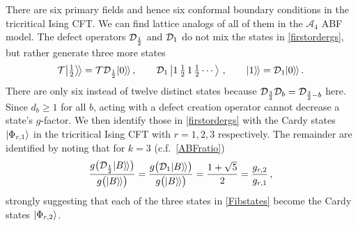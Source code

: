 There are six primary fields and hence six conformal boundary conditions in the tricritical Ising CFT. We can find lattice analogs of all of them in the $\mathcal{A}_4$ ABF model. The defect operators $\mathcal{D}_{\frac12}$ and $\mathcal{D}_1$ do not mix the states in \eqref{firstordergs}, but rather generate three more states
\begin{align}
	\mathcal{T}{\big|{\tfrac12}\big\rangle\!\big\rangle} = \mathcal{T}\mathcal{D}_{\frac12}{|{0}\rangle\mkern-2mu\rangle} \,,
	\qquad\mathcal{D}_1\Ket{1\,\tfrac{1}{2}\,1\,\tfrac{1}{2}\cdots} \,,\qquad {|{1}\rangle\mkern-2mu\rangle}=\mathcal{D}_1{|{0}\rangle\mkern-2mu\rangle} \,.
\label{Fibstates}
\end{align}
There are only six instead of twelve distinct states because $\mathcal{D}_{\frac32}\mathcal{D}_b=\mathcal{D}_{\frac32-b}$ here. Since $d_b\ge 1$ for all $b$, acting with a defect creation operator cannot decrease a state's $g$-factor.
We then identify those in \eqref{firstordergs} with the Cardy states $\Ket{\Phi_{r,1}}$ in the tricritical Ising CFT with $r=1,2,3$ respectively.
The remainder are identified by noting that 
for $k=3$ (c.f.\  \eqref{ABFratio})
\begin{align}
\frac{g\big(\mathcal{D}_{\frac12}{|{B}\rangle\mkern-2mu\rangle}\big)}{g\big({|{B}\rangle\mkern-2mu\rangle}\big)} =
\frac{g\big(\mathcal{D}_1{|{B}\rangle\mkern-2mu\rangle}\big)}{g\big({|{B}\rangle\mkern-2mu\rangle}\big)} =  \frac{1+\sqrt{5}}{2}= \frac{g_{r,2}}{g_{r,1}} \,,
\end{align}
strongly suggesting that each of the three states in \eqref{Fibstates} become the Cardy states $\Ket{\Phi_{r,2}}$. 

